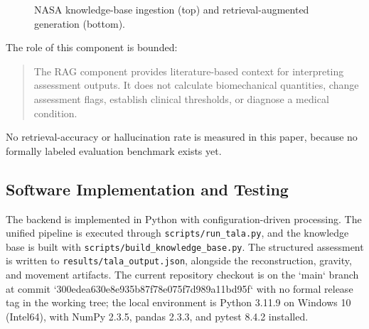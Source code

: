 \documentclass[11pt,a4paper]{article}
\begin{document}
\begin{figure}[H]
\centering
{}
\caption{NASA knowledge-base ingestion (top) and retrieval-augmented generation (bottom).}
\label{fig:rag}
\end{figure}

The role of this component is bounded:
\begin{quote}
The RAG component provides literature-based context for interpreting assessment outputs. It does not calculate biomechanical quantities, change assessment flags, establish clinical thresholds, or diagnose a medical condition.
\end{quote}
No retrieval-accuracy or hallucination rate is measured in this paper, because no formally labeled evaluation benchmark exists yet.

\subsection{Software Implementation and Testing}

The backend is implemented in Python with configuration-driven processing. The unified pipeline is executed through \texttt{scripts/\allowbreak run\_\allowbreak tala.py}, and the knowledge base is built with \texttt{scripts/\allowbreak build\_\allowbreak knowledge\_\allowbreak base.py}. The structured assessment is written to \texttt{results/\allowbreak tala\_\allowbreak output.json}, alongside the reconstruction, gravity, and movement artifacts. The current repository checkout is on the `main` branch at commit `300edea630e8e935b87f78e075f7d989a11bd95f` with no formal release tag in the working tree; the local environment is Python 3.11.9 on Windows 10 (Intel64), with NumPy 2.3.5, pandas 2.3.3, and pytest 8.4.2 installed.
\end{document}

